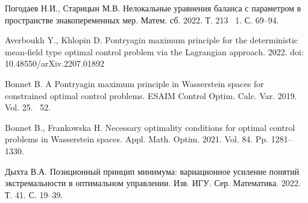 \begin{thebibliography}{9} %

 Погодаев Н.И., Старицын М.В. Нелокальные уравнения баланса с параметром в пространстве знакопеременных мер. Матем. сб. 2022. Т. 213 \textnumero~1. С. 69--94.

 Averboukh Y., Khlopin D. Pontryagin maximum principle for the deterministic mean-field type optimal control problem via the Lagrangian approach. 2022. doi:
10.48550/arXiv.2207.01892

 Bonnet B. A Pontryagin maximum principle in Wasserstein spaces for constrained optimal control problems. ESAIM Control Optim. Calc. Var. 2019. Vol. 25.  \textnumero~52. 

 Bonnet B., Frankowska H. Necessary optimality conditions for optimal control problems in Wasserstein spaces. Appl. Math. Optim. 2021. Vol. 84. Pp. 1281--1330.

 Дыхта В.А. Позиционный принцип минимума: вариационное усиление понятий экстремальности в оптимальном управлении. Изв. ИГУ. Сер. Математика. 2022. Т. 41. С. 19--39.

\end{thebibliography}





%

